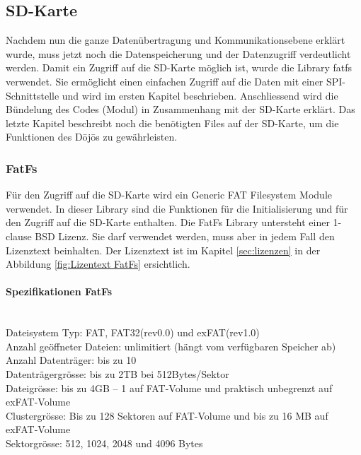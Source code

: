 \subsection{SD-Karte}\label{sec:sdKarte}

Nachdem nun die ganze Datenübertragung und Kommunikationsebene erklärt wurde, muss jetzt noch die Datenspeicherung und der Datenzugriff verdeutlicht werden. Damit ein Zugriff auf die SD-Karte möglich ist, wurde die Library fatfs verwendet. Sie ermöglicht einen einfachen Zugriff auf die Daten mit einer SPI-Schnittstelle und wird im ersten Kapitel beschrieben. Anschliessend wird die Bündelung des Codes (Modul) in Zusammenhang mit der SD-Karte erklärt. Das letzte Kapitel beschreibt noch die benötigten Files auf der SD-Karte, um die Funktionen des Dōjōs zu gewährleisten.

\subsubsection{FatFs}

Für den Zugriff auf die SD-Karte wird ein Generic FAT Filesystem Module verwendet. In dieser Library sind die Funktionen für die Initialisierung und für den Zugriff auf die SD-Karte enthalten. Die FatFs Library untersteht einer 1-clause BSD Lizenz. Sie darf verwendet werden, muss aber in jedem Fall den Lizenztext beinhalten. Der Lizenztext ist im Kapitel \ref{sec:lizenzen} in der Abbildung \ref{fig:Lizentext FatFs} ersichtlich.

\paragraph{Spezifikationen FatFs}$~~$\\
Dateisystem Typ: FAT, FAT32(rev0.0) und exFAT(rev1.0)\\
Anzahl geöffneter Dateien: unlimitiert (hängt vom verfügbaren Speicher ab)\\
Anzahl Datenträger: bis zu 10\\
Datenträgergrösse: bis zu 2TB bei 512Bytes/Sektor\\
Dateigrösse: bis zu 4GB – 1 auf FAT-Volume und praktisch unbegrenzt auf exFAT-Volume\\
Clustergrösse: Bis zu 128 Sektoren auf FAT-Volume und bis zu 16 MB auf exFAT-Volume	\\
Sektorgrösse:  512, 1024, 2048 und 4096 Bytes \cite{FatFs}\\ 

